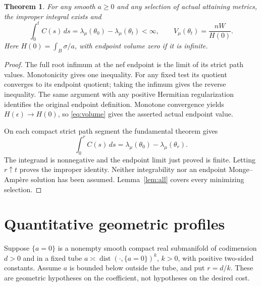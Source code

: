 \documentclass[11pt]{article}
\newtheorem{theorem}{Theorem}
\theoremstyle{remark}\newtheorem{remark}[theorem]{Remark}
\begin{document}
\begin{theorem}\label{th:endpoint}
For any smooth $a\geq0$ and any selection of actual attaining metrics,
the improper integral exists and
\[
 \int_0^t C(s)\,ds
 =\lambda_\mu(\theta_0)-\lambda_\mu(\theta_t)<\infty,
 \qquad V_\mu(\theta_t)=\frac{nW}{H(0)}.
\]
Here $H(0)=\int_B\sigma/a$, with endpoint volume zero if it is infinite.
\end{theorem}
\begin{proof}
The full root infimum at the nef endpoint is the limit of its strict
path values. Monotonicity gives one inequality. For any fixed test its
quotient converges to its endpoint quotient; taking the infimum gives
the reverse inequality. The same argument with any positive Hermitian
regularization identifies the original endpoint definition.
Monotone convergence yields $H(\epsilon)\to H(0)$, so
\eqref{eq:volume} gives the asserted actual endpoint value.

On each compact strict path segment the fundamental theorem gives
\[
 \int_0^r C(s)\,ds=\lambda_\mu(\theta_0)-\lambda_\mu(\theta_r).
\]
The integrand is nonnegative and the endpoint limit just proved is
finite. Letting $r\uparrow t$ proves the improper identity.
Neither integrability nor an endpoint Monge--Amp\`ere solution has been
assumed. Lemma~\ref{lem:all} covers every minimizing selection.
\end{proof}

\section{Quantitative geometric profiles}
Suppose $\{a=0\}$ is a nonempty smooth compact real submanifold of codimension
$d>0$ and in a fixed tube
$a\asymp\operatorname{dist}(\cdot,\{a=0\})^k$, $k>0$,
with positive two-sided constants. Assume $a$ is bounded below outside
the tube, and put $r=d/k$. These are geometric hypotheses on the
coefficient, not hypotheses on the desired cost.
\end{document}
